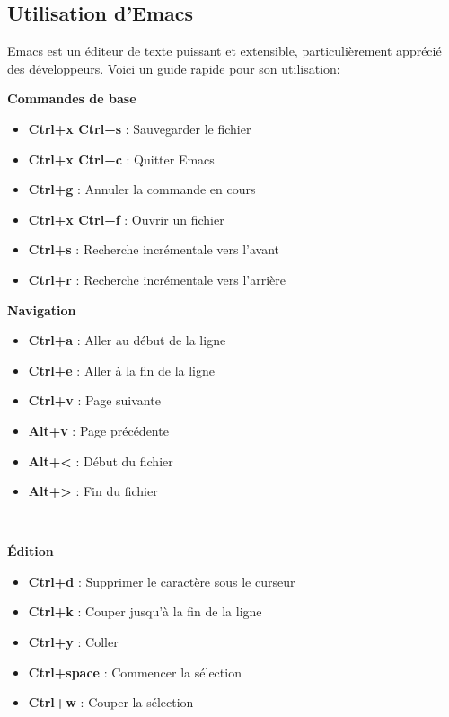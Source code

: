 \documentclass[10pt]{book}
\begin{document}
\begin{appendices}
\subsection{Utilisation d'Emacs}
Emacs est un éditeur de texte puissant et extensible, particulièrement apprécié des développeurs. Voici un guide rapide pour son utilisation:
\\\bigskip\begin{minipage}[t]{.54\linewidth}
\textbf{Commandes de base}
\begin{itemize}
\item \textbf{Ctrl+x Ctrl+s} : Sauvegarder le fichier
\item \textbf{Ctrl+x Ctrl+c} : Quitter Emacs
\item \textbf{Ctrl+g} : Annuler la commande en cours
\item \textbf{Ctrl+x Ctrl+f} : Ouvrir un fichier
\item \textbf{Ctrl+s} : Recherche incrémentale vers l'avant
\item \textbf{Ctrl+r} : Recherche incrémentale vers l'arrière
\end{itemize}
\end{minipage}\hfill
\begin{minipage}[t]{.44\linewidth}
\textbf{Navigation}
\begin{itemize}
\item \textbf{Ctrl+a} : Aller au début de la ligne
\item \textbf{Ctrl+e} : Aller à la fin de la ligne
\item \textbf{Ctrl+v} : Page suivante
\item \textbf{Alt+v} : Page précédente
\item \textbf{Alt+<} : Début du fichier
\item \textbf{Alt+>} : Fin du fichier
\end{itemize}
\end{minipage}
\\\bigskip\begin{minipage}[t]{.46\linewidth}
\textbf{Édition}
\begin{itemize}
\item \textbf{Ctrl+d} : Supprimer le caractère sous le curseur
\item \textbf{Ctrl+k} : Couper jusqu'à la fin de la ligne
\item \textbf{Ctrl+y} : Coller
\item \textbf{Ctrl+space} : Commencer la sélection
\item \textbf{Ctrl+w} : Couper la sélection

\end{itemize}
\end{minipage}
\end{appendices}
\end{document}
